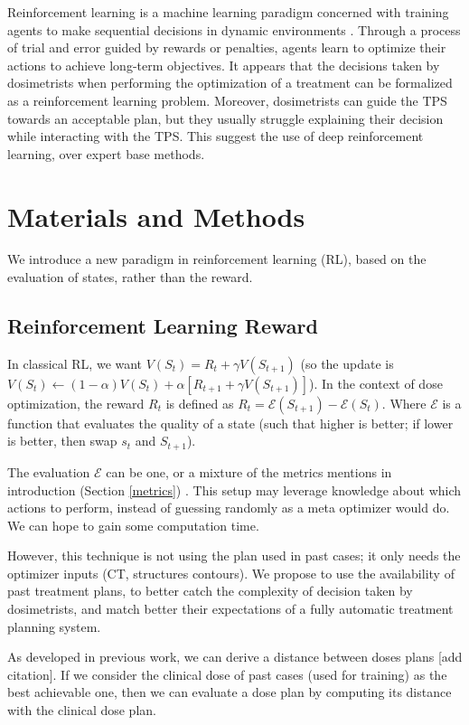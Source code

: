 Reinforcement learning is a machine learning paradigm concerned with training agents to make sequential decisions in dynamic environments \cite{brooks_what_2021}.
Through a process of trial and error guided by rewards or penalties, agents learn to optimize their actions to achieve long-term objectives.
It appears that the decisions taken by dosimetrists when performing the optimization of a treatment can be formalized as a reinforcement learning problem.
Moreover, dosimetrists can guide the TPS towards an acceptable plan, but they usually struggle explaining their decision while interacting with the TPS.
This suggest the use of deep reinforcement learning, over expert base methods.

\section{Materials and Methods}
We introduce a new paradigm in reinforcement learning (RL), based on the evaluation of states, rather than the reward.

\subsection{Reinforcement Learning Reward}
In classical RL, we want $V(S_t) = R_t + \gamma V(S_{t+1})$
(so the update is $V(S_t) \leftarrow (1-\alpha) V(S_t) + \alpha \left[ R_{t+1} + \gamma V(S_{t+1}) \right]$).
In the context of dose optimization, the reward $R_t$ is defined as $R_t = \mathcal{E}(S_{t+1}) - \mathcal{E}(S_t)$.
Where $\mathcal{E}$ is a function that evaluates the quality of a state (such that higher is better; if lower is better, then swap $s_t$ and $S_{t+1}$).

The evaluation $\mathcal{E}$ can be one, or a mixture of the metrics mentions in introduction (Section \ref{metrics}) \cite{shen_hierarchical_2021} \cite{shen_intelligent_2019} \cite{moreau_reinforcement_2021}.
This setup may leverage knowledge about which actions to perform, instead of guessing randomly as a meta optimizer would do.
We can hope to gain some computation time.

However, this technique is not using the plan used in past cases; it only needs the optimizer inputs (CT, structures contours).
We propose to use the availability of past treatment plans, to better catch the complexity of decision taken by dosimetrists, and match better their expectations of a fully automatic treatment planning system.

As developed in previous work, we can derive a distance between doses plans [add citation].
If we consider the clinical dose of past cases (used for training) as the best achievable one, then we can evaluate a dose plan by computing its distance with the clinical dose plan.

